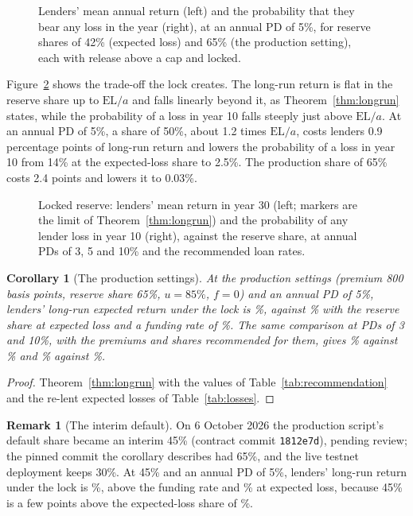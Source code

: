 \documentclass[11pt]{article}
\theoremstyle{plain}
\newtheorem{corollary}{Corollary}
\theoremstyle{definition}
\newtheorem{remark}{Remark}
\newcommand{\EL}{\mathrm{EL}}
\begin{document}
\begin{figure}[ht]
  \centering
  
  \caption{Lenders' mean annual return (left) and the probability that they bear any loss in the
  year (right), at an annual PD of 5\%, for reserve shares of 42\% (expected loss) and 65\% (the
  production setting), each with release above a cap and locked.}
  \label{fig:years}
\end{figure}

Figure~\ref{fig:sweep} shows the trade-off the lock creates. The long-run return is flat in the
reserve share up to $\EL/a$ and falls linearly beyond it, as Theorem~\ref{thm:longrun} states, while
the probability of a loss in year 10 falls steeply just above $\EL/a$. At an annual PD of 5\%, a share
of 50\%, about 1.2 times $\EL/a$, costs lenders 0.9 percentage points of long-run return and lowers the
probability of a loss in year 10 from 14\% at the expected-loss share to 2.5\%. The production share of
65\% costs 2.4 points and lowers it to 0.03\%.

\begin{figure}[ht]
  \centering
  
  \caption{Locked reserve: lenders' mean return in year 30 (left; markers are the limit of
  Theorem~\ref{thm:longrun}) and the probability of any lender loss in year 10 (right), against the
  reserve share, at annual PDs of 3, 5 and 10\% and the recommended loan rates.}
  \label{fig:sweep}
\end{figure}

\begin{corollary}[The production settings]\label{cor:production}
At the production settings (premium 800 basis points, reserve share 65\%, $u=85\%$, $f=0$) and an
annual PD of 5\%, lenders' long-run expected return under the lock is \LongRunLockedFive\%, against
\LongRunAtElFive\% with the reserve share at expected loss and a funding rate of \Effr\%. The same
comparison at PDs of 3 and 10\%, with the premiums and shares recommended for them, gives
\LongRunLockedThree\% against \LongRunAtElThree\% and \LongRunLockedTen\% against \LongRunAtElTen\%.
\end{corollary}

\begin{proof}
Theorem~\ref{thm:longrun} with the values of Table~\ref{tab:recommendation} and the re-lent expected
losses of Table~\ref{tab:losses}.
\end{proof}

\begin{remark}[The interim default]\label{rem:interim}
On 6 October 2026 the production script's default share became an interim 45\% (contract commit
\texttt{1812e7d}), pending review; the pinned commit the corollary describes had 65\%, and the live
testnet deployment keeps 30\%. At 45\% and an annual PD of 5\%, lenders' long-run return under the lock
is \LongRunFortyFiveFive\%, above the funding rate and \LongRunAtElFive\% at expected loss, because 45\%
is a few points above the expected-loss share of \RElFive\%.
\end{remark}
\end{document}
